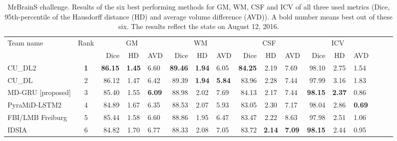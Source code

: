 \documentclass[a4paper,9pt]{llncs}
\begin{document}
\begin{table}
\begin{center}
 \caption{MrBrainS challenge. Results of the six best performing methods for GM, WM, CSF and ICV of all three used metrics (Dice, 95th-percentile of the Hausdorff distance (HD) and average volume difference (AVD)). A bold number means best out of these six. The results reflect the state on August 12, 2016.}
\label{mrbrainsres}
 \scriptsize
\begin{tabular}{l c rcl rcl rcl rcl rcl}
\toprule
Team name &  Rank &\multicolumn{3}{c}{GM} & \multicolumn{3}{c}{WM} & \multicolumn{3}{c}{CSF} &  \multicolumn{3}{c}{ICV}\\%
&  & Dice & HD & AVD & Dice & HD & AVD & Dice & HD & AVD & Dice & HD & AVD \\\midrule
CU\_DL2  & \textbf{1}& \textbf{86.15} & \textbf{1.45} & 6.60 & \textbf{89.46} & \textbf{1.94} & 6.05 & \textbf{84.25}& 2.19 & 7.69 &  98.10 & 2.75 & 1.54\\
CU\_DL& 2  & 86.12 & 1.47 & 6.42 & 89.39 & \textbf{1.94} & \textbf{5.84} & 83.96 & 2.28 & 7.44 &  97.99 & 3.16 & 1.83 \\
MD-GRU [proposed] & 3 & 85.40 & 1.55 & \textbf{6.09} & 88.98 & 2.02 & 7.69 & 84.13 & 2.17 & 7.44 & \textbf{98.15} & \textbf{2.37} & 0.86\\
PyraMiD-LSTM2 & 4 & 84.89 & 1.67 & 6.35 & 88.53 & 2.07 & 5.93 & 83.05 & 2.30 & 7.17 &  98.04 & 2.86 & \textbf{0.69}\\
FBI/LMB Freiburg& 5 & 85.44 & 1.58 & 6.60 & 88.86 & 1.95 & 6.47 & 83.47 & 2.22 & 8.63 &  97.98 & 2.51 & 1.06\\
IDSIA& 6 & 84.82 & 1.70 & 6.77 & 88.33 & 2.08 & 7.05& 83.72 & \textbf{2.14} & \textbf{7.09}& \textbf{98.15} & 2.44 & 0.95\\\bottomrule
\end{tabular}
\end{center}
 \label{resultschallenge}
\end{table}
\end{document}
